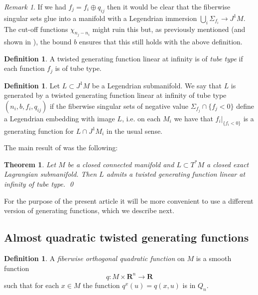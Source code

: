 \documentclass[reqno]{amsart}
\theoremstyle{theorem}
\newtheorem{theorem}{Theorem}
\theoremstyle{remark}
\newtheorem{remark}[corollary]{Remark}
\theoremstyle{definition}
\newtheorem{definition}[corollary]{Definition}
\newcommand{\R}{\mathbf{R}}
\begin{document}
\begin{remark}\label{rem:legtwisted}
If we had $f_j=f_i\oplus q_{ij}$ then it would be clear that the fiberwise singular sets glue into a manifold
with a Legendrian immersion $\bigcup_i \Sigma_{f_i} \to J^1 M$. The cut-off functions $\chi_{n_j-n_i}$ might ruin this but,
as previously mentioned (and shown in \cite{ACGK}), the bound $b$ ensures that this still holds with the above definition.
\end{remark}


\begin{definition}
A twisted generating function linear at infinity is of \emph{tube type} if each function $f_j$ is of tube type.
\end{definition}


\begin{definition}
Let $L \subset J^1M$ be a Legendrian submanifold. We say that $L$ is generated by a twisted generating
function linear at infinity of tube type $(n_i,b,f_i,q_{ij})$ if the fiberwise singular sets of negative value $\Sigma_{f_j}\cap \{f_j <0\}$  define a Legendrian embedding with image $L$, i.e. on each $M_i$ we have that $f_i|_{\{f_i<0\}}$ is a generating function for $L \cap J^1M_i$ in the usual sense.
\end{definition}


The main result of \cite{ACGK} was the following:


\begin{theorem}\label{thm:acgk}
Let $M$ be a closed connected manifold and $L \subset T^*M$ a closed exact Lagrangian submanifold.
Then $L$ admits a twisted generating function linear at infinity of tube type. \qed
\end{theorem}


For the purpose of the present article it will be more convenient to use a different version of generating functions, which we describe next.


\subsection{Almost quadratic twisted generating functions}
\label{sec:almost-quadr-twist}


\begin{definition} 
 A \emph{fiberwise orthogonal quadratic function} on $M$ is a smooth function
\begin{equation}
    q:M\times \R^n\to \R
\end{equation}
such that for each $x \in M$ the function $q^x(u)=q(x,u)$ is in $Q_n$.
\end{definition}
\end{document}
